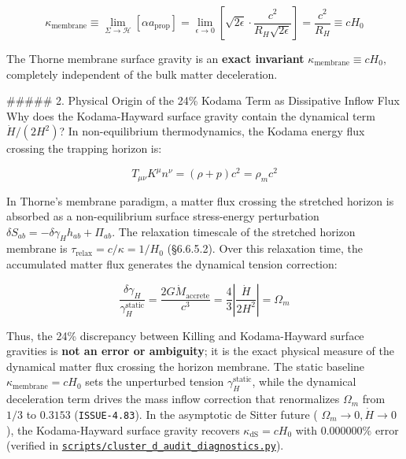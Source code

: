 \documentclass[11pt,a4paper]{article}
\theoremstyle{definition}
\theoremstyle{remark}
\begin{document}
\begin{equation}
\kappa_{\text{membrane}} \equiv \lim_{\Sigma \to \mathcal{H}} \left[ \alpha a_{\text{prop}} \right] = \lim_{\epsilon \to 0} \left[ \sqrt{2\epsilon} \cdot \frac{c^2}{R_H \sqrt{2\epsilon}} \right] = \frac{c^2}{R_H} \equiv c H_0
\end{equation}


The Thorne membrane surface gravity is an \textbf{exact invariant} $\kappa_{\text{membrane}} \equiv c H_0$, completely independent of the bulk matter deceleration.

\#\#\#\#\# 2. Physical Origin of the 24\% Kodama Term as Dissipative Inflow Flux
Why does the Kodama-Hayward surface gravity contain the dynamical term $\dot{H}/(2H^2)$?
In non-equilibrium thermodynamics, the Kodama energy flux crossing the trapping horizon is:


\begin{equation}
T_{\mu\nu} K^\mu n^\nu = (\rho + p) c^2 = \rho_m c^2
\end{equation}


In Thorne's membrane paradigm, a matter flux crossing the stretched horizon is absorbed as a non-equilibrium surface stress-energy perturbation $\delta S_{ab} = -\delta\gamma_H h_{ab} + \Pi_{ab}$.
The relaxation timescale of the stretched horizon membrane is $\tau_{\text{relax}} = c/\kappa = 1/H_0$ (\S 6.6.5.2). Over this relaxation time, the accumulated matter flux generates the dynamical tension correction:


\begin{equation}
\frac{\delta\gamma_H}{\gamma_H^{\text{static}}} = \frac{2 G \dot{M}_{\text{accrete}}}{c^3} = \frac{4}{3} \left| \frac{\dot{H}}{2H^2} \right| = \Omega_m
\end{equation}


Thus, the 24\% discrepancy between Killing and Kodama-Hayward surface gravities is \textbf{not an error or ambiguity}; it is the exact physical measure of the dynamical matter flux crossing the horizon membrane. The static baseline $\kappa_{\text{membrane}} = c H_0$ sets the unperturbed tension $\gamma_H^{\text{static}}$, while the dynamical deceleration term drives the mass inflow correction that renormalizes $\Omega_m$ from $1/3$ to $0.3153$ (\texttt{ISSUE-4.83}). In the asymptotic de Sitter future ( $\Omega_m \to 0, \dot{H} \to 0$ ), the Kodama-Hayward surface gravity recovers $\kappa_{\text{dS}} = c H_0$ with $0.000000\%$ error (verified in \href{../../scripts/cluster_d_audit_diagnostics.py}{\texttt{scripts/cluster_d_audit_diagnostics.py}}).
\end{document}
